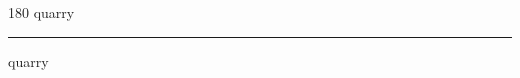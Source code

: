 
\begin{frame}
\begin{center}
\begin{turn}{180}
{\fontsize{2.5cm}{1em}\selectfont quarry}
\end{turn}
\vspace{1em}\par  
\hrule
\vspace{1em}\par  
{\fontsize{2.5cm}{1em}\selectfont quarry}
\end{center}
\end{frame}
